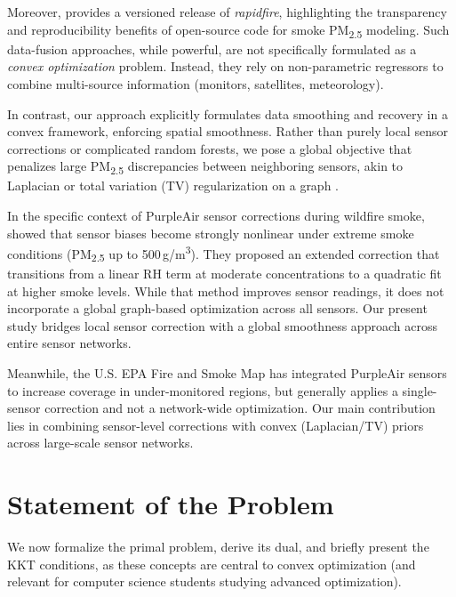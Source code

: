 \documentclass[12pt]{article}                                %
\begin{document}
Moreover, \cite{rapidfireZenodo2023v013} provides a versioned release of \emph{rapidfire}, 
highlighting the transparency and reproducibility benefits of open-source code for smoke 
PM\textsubscript{2.5} modeling. Such data-fusion approaches, while powerful, are not 
specifically formulated as a \textit{convex optimization} problem. Instead, they rely on 
non-parametric regressors to combine multi-source information (monitors, satellites, meteorology). 

In contrast, our approach explicitly formulates data smoothing and recovery in a convex framework, 
enforcing spatial smoothness. Rather than purely local sensor corrections or complicated random 
forests, we pose a global objective that penalizes large PM\textsubscript{2.5} discrepancies 
between neighboring sensors, akin to Laplacian or total variation (TV) regularization on a graph 
\cite{ShumanGSP}.

In the specific context of PurpleAir sensor corrections during wildfire smoke, \cite{Barkjohn2022Sensors} 
showed that sensor biases become strongly nonlinear under extreme smoke conditions 
(PM\textsubscript{2.5} up to 500\,\textmu g/m\textsuperscript{3}). They proposed an extended 
correction that transitions from a linear RH term at moderate concentrations to a quadratic fit 
at higher smoke levels. While that method improves sensor readings, it does not incorporate a 
global graph-based optimization across all sensors. Our present study bridges local sensor 
correction with a global smoothness approach across entire sensor networks.

Meanwhile, the U.S. EPA Fire and Smoke Map \cite{EPAwebinar2021} has integrated PurpleAir sensors 
to increase coverage in under-monitored regions, but generally applies a single-sensor correction 
and not a network-wide optimization. Our main contribution lies in combining sensor-level 
corrections with convex (Laplacian/TV) priors across large-scale sensor networks.

\section{Statement of the Problem}
\label{sec:problem-statement}   %

We now formalize the primal problem, derive its dual, and briefly present the KKT conditions, 
as these concepts are central to convex optimization (and relevant for computer science 
students studying advanced optimization).
\end{document}
